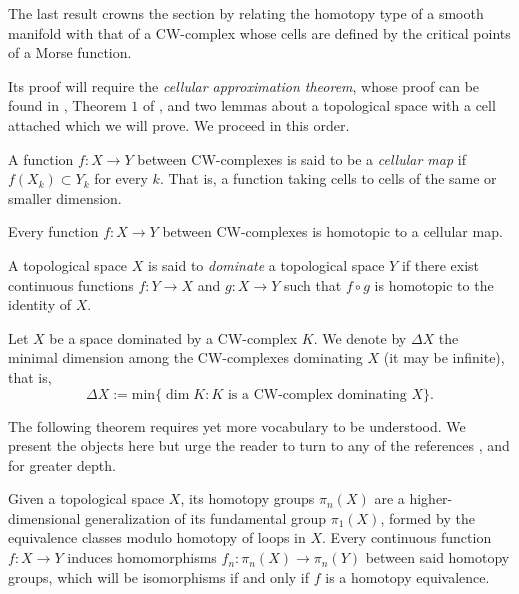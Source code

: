 The last result crowns the section by relating the homotopy type of a smooth manifold with that of a CW-complex whose cells are defined by the critical points of a Morse function.

Its proof will require the \textit{cellular approximation theorem}, whose proof can be found in \cite[p.~349]{hatcher2002}, Theorem $1$ of \cite{Whitehead1949CombinatorialHomotopy}, and two lemmas about a topological space with a cell attached which we will prove. We proceed in this order.
\vspace{0.5em}

\begin{definition}
    A function $f:X\to Y$ between CW-complexes is said to be a \textit{cellular map} if $f(X_k)\subset Y_k$ for every $k$. That is, a function taking cells to cells of the same or smaller dimension.
\end{definition}
\begin{theorem}
\label{aprox_celular}
    Every function $f:X\to Y$ between CW-complexes is homotopic to a cellular map.
\end{theorem}

\bigskip

\begin{definition}
    A topological space $X$ is said to \textit{dominate} a topological space $Y$ if there exist continuous functions $f:Y\to X$ and $g:X\to Y$ such that $f\circ g$ is homotopic to the identity of $X$.
\end{definition}

\begin{definition}
    Let $X$ be a space dominated by a CW-complex $K$. We denote by $\Delta X$ the minimal dimension among the CW-complexes dominating $X$ (it may be infinite), that is,
    \begin{equation*}
        \Delta X := \text{min}\{\dim K\colon K \text{ is a CW-complex dominating }X\}.
    \end{equation*}
\end{definition}

The following theorem requires yet more vocabulary to be understood. We present the objects here but urge the reader to turn to any of the references \cite{Whitehead1949CombinatorialHomotopy}, \cite{munoz2021} and \cite{hatcher2002} for greater depth.

Given a topological space $X$, its homotopy groups $\pi_n(X)$ are a higher-dimensional generalization of its fundamental group $\pi_1(X)$, formed by the equivalence classes modulo homotopy of loops in $X$. Every continuous function $f:X\to Y$ induces homomorphisms $f_n:\pi_n(X)\to \pi_n(Y)$ between said homotopy groups, which will be isomorphisms if and only if $f$ is a homotopy equivalence.

